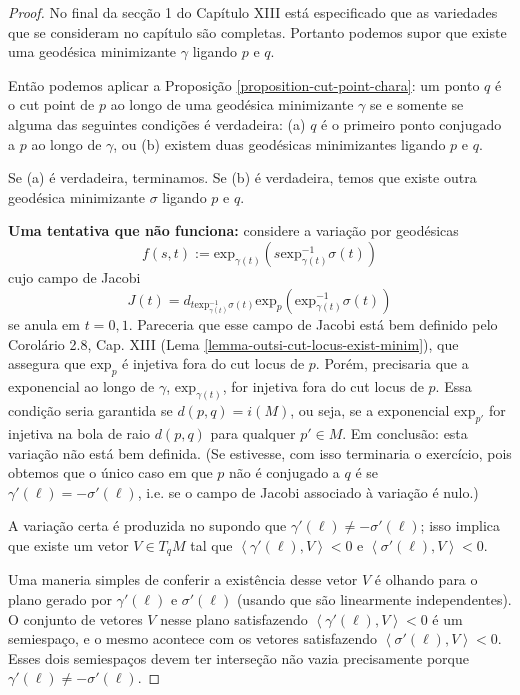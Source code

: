 \begin{proof}
No final da secção 1 do Capítulo XIII está
especificado que as variedades que se
consideram no capítulo são completas.
Portanto podemos supor que existe
uma geodésica minimizante $\gamma$ ligando
$p$ e $q$.

Então podemos aplicar a Proposição
\ref{proposition-cut-point-chara}:
 um ponto $q$ é o cut point de $p$ ao longo
 de uma
geodésica minimizante $\gamma$ se e somente
se
alguma das seguintes condições é verdadeira:
(a) $q$ é o primeiro ponto conjugado a $p$ ao
longo de $\gamma$, ou
(b) existem duas geodésicas minimizantes
ligando $p$ e $q$.

Se (a) é verdadeira, terminamos. Se (b) é
verdadeira, temos que existe outra
geodésica minimizante $\sigma$ ligando $p$ e
$q$.

{\bf Uma tentativa que não funciona:}
considere a variação por geodésicas
$$
f(s,t):=\text{exp}_{\gamma(t)}
(s\text{exp}_{\gamma(t)}^{-1}\sigma(t))
$$
cujo campo de Jacobi
$$
J(t)=d_{t\text{exp}_{\gamma(t)}^{-1}\sigma(t)
}
\text{exp}_p(\text{exp}_{\gamma(t)}^{-1}
\sigma(t))
$$
se anula em $t=0,1$. Pareceria que esse campo de
Jacobi está bem definido pelo
Corolário 2.8, Cap. XIII (Lema
\ref{lemma-outsi-cut-locus-exist-minim}), que
assegura
 que $\text{exp}_p$ é injetiva fora do cut
 locus de $p$. Porém, precisaria
 que a exponencial ao longo de $\gamma$,
 $\text{exp}_{\gamma(t)}$, for injetiva fora
 do cut locus de $p$.
Essa condição seria garantida se
$d(p,q)=i(M)$, ou seja, se a exponencial
 $\text{exp}_{p'}$ for injetiva na bola de
 raio $d(p,q)$ para qualquer
$p' \in M$. Em conclusão: esta variação não
está bem definida.
(Se estivesse, com
isso terminaria o exercício, pois obtemos que
o único caso em que $p$ não é
conjugado a $q$ é se
$\gamma'(\ell)=-\sigma'(\ell)$, i.e. se o
campo de Jacobi
associado à variação é nulo.)

\bigskip

A variação certa é produzida no \cite{doc}
supondo que
$\gamma'(\ell)\neq -\sigma'(\ell)$; isso
implica que existe um vetor
 $V \in T_q M$ tal que
$\left\langle{}\gamma'(\ell),V\right\rangle{}< 0$ e
$\left\langle{}\sigma'(\ell),V\right\rangle{}< 0$.

Uma maneria simples de conferir a existência
desse vetor $V$ é olhando para o
plano gerado por $\gamma'(\ell)$ e
$\sigma'(\ell)$ (usando que são linearmente
independentes). O conjunto de vetores $V$
nesse plano satisfazendo
$\left\langle{}\gamma'(\ell),V\right\rangle{}<0$ é um
semiespaço, e o mesmo acontece com
 os vetores satisfazendo
 $\left\langle{}\sigma'(\ell),V\right\rangle{}<0$. Esses dois
 semiespaços
devem ter interseção não vazia precisamente
porque
$\gamma'(\ell)\neq -\sigma'(\ell)$.


\end{proof}
